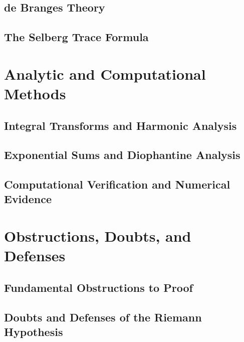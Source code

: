 \documentclass[12pt,a4paper,twoside]{book}
\theoremstyle{plain}
\theoremstyle{definition}
\theoremstyle{remark}
\begin{document}
\chapter{de Branges Theory}
\label{ch:debranges}


\chapter{The Selberg Trace Formula}
\label{ch:selberg_trace}


\part{Analytic and Computational Methods}

\chapter{Integral Transforms and Harmonic Analysis}
\label{ch:integral_transforms}


\chapter{Exponential Sums and Diophantine Analysis}
\label{ch:exponential_sums}


\chapter{Computational Verification and Numerical Evidence}
\label{ch:computational}


\part{Obstructions, Doubts, and Defenses}

\chapter{Fundamental Obstructions to Proof}
\label{ch:obstructions}


\chapter{Doubts and Defenses of the Riemann Hypothesis}
\label{ch:doubts_defenses}

\end{document}
